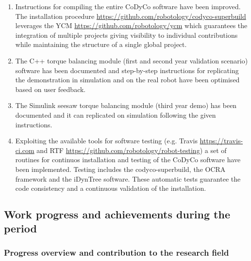 \documentclass[12pt,a4paper,twoside]{article}
\begin{document}
\begin{enumerate}
\item Instructions for compiling the entire CoDyCo software have been improved. The installation procedure \url{https://github.com/robotology/codyco-superbuild} leverages the YCM \url{https://github.com/robotology/ycm} which guarantees the integration of multiple projects giving visibility to individual contributions while maintaining the structure of a single global project.  
	
\item The C++ torque balancing module (first and second year validation scenario) software has been documented and step-by-step instructions for replicating the demonstration in simulation and on the real robot have been optimised based on user feedback.

\item The Simulink seesaw torque balancing module (third year demo) has been documented and it can replicated on simulation following the given instructions. 

\item Exploiting the available tools for software testing (e.g. Travis \url{https://travis-ci.com} and RTF \url{https://github.com/robotology/robot-testing}) a set of routines for continuos installation and testing of the CoDyCo software have been implemented. Testing includes the codyco-superbuild, the OCRA framework and the iDynTree software. These automatic tests guarantee the code consistency and a continuous validation of the installation.

\end{enumerate}










\subsection{Work progress and achievements during the period}

\subsubsection{Progress overview and contribution to the research field}
\end{document}
